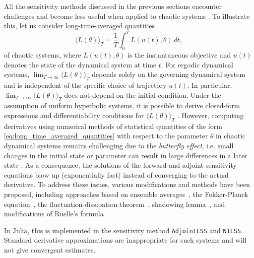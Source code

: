 All the sensitivity methods discussed in the previous sections encounter challenges and become less useful when applied to chaotic systems \cite{Wang2012-chaos-adjoint}.
To illustrate this, let us consider long-time-averaged quantities 
\begin{equation}\label{eq:long_time_averaged_quantities}
    \langle L(\theta) \rangle_T = \frac{1}{T} \int_0^T L(u(t), \theta) \, dt, 
\end{equation}
of chaotic systems, where $L(u(t), \theta)$ is the instantaneous objective and $u(t)$ denotes the state of the dynamical system at time $t$.
For ergodic dynamical systems, $\lim_{T\to\infty} \langle L(\theta) \rangle_T$ depends solely on the governing dynamical system and is independent of the specific choice of trajectory $u(t)$. 
In particular, $\lim_{T\to\infty} \langle L(\theta) \rangle_T$ does not depend on the initial condition. 
Under the assumption of uniform hyperbolic systems, it is possible to derive closed-form expressions and differentiability conditions for $ \langle L(\theta) \rangle_T$ \cite{ruelle1997differentiation,ruelle2009review}.
However, computing derivatives using numerical methods of statistical quantities of the form \eqref{eq:long_time_averaged_quantities} with respect to the parameter $\theta$ in chaotic dynamical systems remains challenging due to the \textit{butterfly effect}, i.e. small changes in the initial state or parameter can result in large differences in a later state \cite{Lorenz.1963}.
As a consequence, the solutions of the forward and adjoint sensitivity equations blow up (exponentially fast) instead of converging to the actual derivative.
To address these issues, various modifications and methods have been proposed, including approaches based on ensemble averages~\cite{lea2000sensitivity, eyink2004ruelle}, the Fokker-Planck equation~\cite{thuburn2005climate, blonigan2014probability}, the fluctuation-dissipation theorem~\cite{leith1975climate, abramov2007blended, abramov2008new}, shadowing lemma~\cite{wang2013forward, wang2014least, wang2014convergence, ni2017sensitivity, blonigan2017adjoint, blonigan2018multiple, ni2019adjoint, ni2019sensitivity}, and modifications of Ruelle's formula~\cite{chandramoorthy2022efficient, ni2020fast}.

In Julia, this is implemented in the sensitivity method \texttt{AdjointLSS} and \texttt{NILSS}. %
Standard derivative approximations are inappropriate for such systems and will not give convergent estimates.
